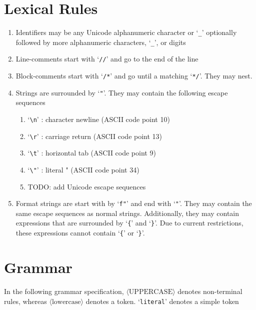 \documentclass[10pt]{article}
\begin{document}
\section*{Lexical Rules}

\begin{enumerate}
    \item Identifiers may be any Unicode alphanumeric character or `\verb|_|' optionally followed by more alphanumeric characters, `\verb|_|', or digits
    \item Line-comments start with `\verb|//|' and go to the end of the line
    \item Block-comments start with `\verb|/*|' and go until a matching `\verb|*/|'. They may nest.
    \item Strings are surrounded by `\verb|"|'. They may contain the following escape sequences \begin{enumerate}
              \item `\verb|\n|' : character newline (ASCII code point 10)
              \item `\verb|\r|' : carriage return (ASCII code point 13)
              \item `\verb|\t|' : horizontal tab (ASCII code point 9)
              \item `\verb|\"|' : literal " (ASCII code point 34)
              \item TODO: add Unicode escape sequences
          \end{enumerate}

    \item Format strings are start with by `\verb|f"|' and end with `\verb|"|'. They may contain the same escape sequences as normal strings. Additionally, they may contain expressions that are surrounded by `\verb|{|' and `\verb|}|'. Due to current restrictions, these expressions cannot contain `\verb|{|' or `\verb|}|'.

\end{enumerate}

\section*{Grammar}
\setlength{\grammarparsep}{20pt plus 1pt minus 1pt}
\setlength{\grammarindent}{12em}

In the following grammar specification, $\langle \text{UPPERCASE} \rangle$
denotes non-terminal rules, whereas $\langle \text{lowercase} \rangle$ denotes a token. `\verb|literal|' denotes a simple token
\end{document}
